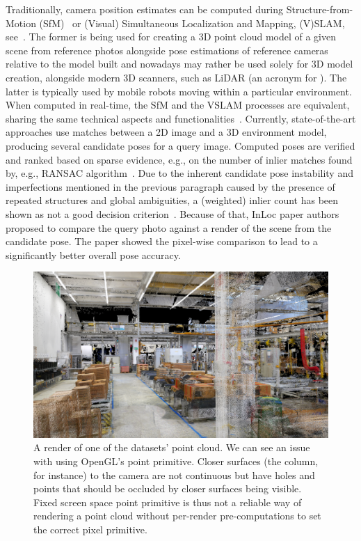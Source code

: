 Traditionally, camera position estimates can be computed during Structure-from-Motion (SfM)~\citep{SfM} or
(Visual) Simultaneous Localization and Mapping, (V)SLAM, see~\citet{SLAM}. The former is being used for creating
a 3D point cloud model of a given scene from reference photos alongside pose estimations of reference
cameras relative to the model built and nowadays may rather be used solely for 3D model creation, alongside
modern 3D scanners, such as LiDAR (an acronym for ).
The latter is typically used by mobile robots moving within
a particular environment. When computed in real-time, the SfM and the VSLAM processes
are equivalent, sharing the same technical aspects and functionalities~\citep{VNAV}. Currently,
state-of-the-art approaches use matches between a 2D image and a 3D environment model,
producing several candidate poses for a query image. Computed poses are verified and ranked based
on sparse evidence, e.g., on the number
of inlier matches found by, e.g., RANSAC algorithm~\citep{RANSAC}. Due to the inherent candidate pose
instability and imperfections mentioned in the previous paragraph caused by the presence of repeated structures and
global ambiguities, a (weighted) inlier count has been shown as not a good
decision criterion~\citep{Burstiness}. Because of that,  InLoc paper authors~\citep{InLoc} proposed to compare
the query photo against a render of the scene from the candidate pose. The paper showed the pixel-wise comparison
to lead to a significantly better overall pose accuracy.

\begin{figure}
    \centering
    \includegraphics[width=.9\textwidth]{../graphics/0217_pyrender_artwin_render.png}
    \caption[Basic OpenGL point cloud rendering example]{A render of one of the datasets'
    point cloud. We can see an issue with using OpenGL's point
    primitive. Closer surfaces (the column, for instance) to the camera are not continuous but have holes
    and points that should be occluded by closer surfaces being visible. Fixed screen space point
    primitive is thus not a reliable way of rendering a point cloud without per-render pre-computations
    to set the correct pixel primitive.}\label{fig:pyrender_artwin_render}
\end{figure}

